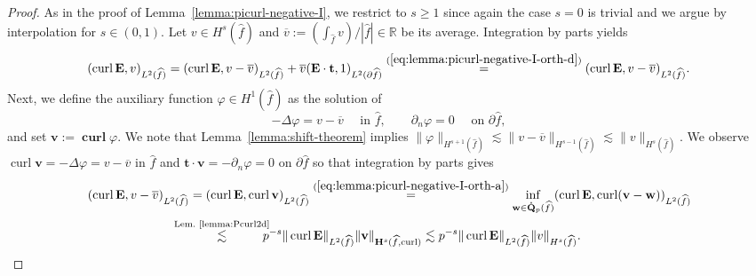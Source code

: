 \documentclass{article}
\newcommand\neu[1]{{\color{red}#1}}
\begin{document}
\begin{proof} 

As in the proof of Lemma~\ref{lemma:picurl-negative-I}, we restrict to $s \ge 1$ since again
the case $s = 0$ is trivial and we argue by interpolation for $s \in (0,1)$.  
Let $v\in H^{s}(\widehat{f})$ and $\overline{v}:=(\int_{\widehat{f}}v)/|\widehat{f}|\in{\mathbb{R}}$ be its
average. Integration by parts yields
\[
(\operatorname{curl}{\mathbf{E}},v)_{L^{2}(\widehat{f})}=(\operatorname{curl}%
{\mathbf{E}},v-\overline{v})_{L^{2}(\widehat{f})}+\overline{v}({\mathbf{E}}%
\cdot{\mathbf{t}},1)_{L^{2}(\partial \widehat{f})}%
\overset{(\ref{eq:lemma:picurl-negative-I-orth-d})}{=}(\operatorname{curl}%
{\mathbf{E}},v-\overline{v})_{L^{2}(\widehat{f})}.
\]
Next, we define the auxiliary function $\varphi\in H^{1}(\widehat{f})$ as
the solution of 
\[
-\Delta\varphi=v-\overline{v}\quad\mbox{ in }\widehat{f},\qquad\partial_{n}%
\varphi=0\quad\mbox{ on }\partial \widehat{f},
\] 
and set ${\mathbf{v}}:=\operatorname{\mathbf{curl}}\varphi$. 
We note that Lemma~\ref{lemma:shift-theorem} implies 
$\|\varphi\|_{H^{s+1}(\widehat{f})} \lesssim \|v-\overline{v}\|_{H^{s-1}(\widehat f)}
\lesssim \|v\|_{H^s(\widehat f)}$.
We observe
$\operatorname{curl}{\mathbf{v}}=-\Delta
\varphi=v-\overline{v}$ in $\widehat{f}$ and ${\mathbf{t}}\cdot{\mathbf{v}}%
=-\partial_{n}\varphi=0$ on $\partial \widehat{f}$ so that integration by parts gives
\begin{align*}
(\operatorname{curl}{\mathbf{E}},v-\overline{v})_{L^{2}(\widehat{f})}  &
=(\operatorname{curl}{\mathbf{E}},\operatorname{curl}{\mathbf{v}})_{L^{2}%
(\widehat{f})}\overset{(\ref{eq:lemma:picurl-negative-I-orth-a})}{=}\inf_{{\mathbf{w}%
}\in\mathring{\mathbf{Q}}_{p}(\widehat{f})}(\operatorname{curl}{\mathbf{E}}%
,\operatorname{curl}({\mathbf{v}}-{\mathbf{w}}))_{L^{2}(\widehat{f})}\\
&  
\!\!\!
\!\!\!
\!\!\!
\stackrel{\text{Lem.~\ref{lemma:Pcurl2d}}}{\lesssim} 
\!\!\!\!\!
p^{-s}\Vert\operatorname{curl}{\mathbf{E}}\Vert_{L^{2}(\widehat{f})}%
\Vert{\mathbf{v}}\Vert_{\mathbf{H}^{s}(\widehat{f},\operatorname{curl})}\lesssim p^{-s}%
\Vert\operatorname{curl}{\mathbf{E}}\Vert_{L^{2}(\widehat{f})}\Vert v\Vert_{H^{s}(\widehat{f})}.
\qedhere
\end{align*}
\end{proof}
\end{document}
